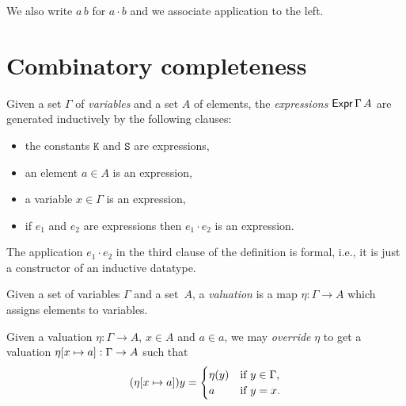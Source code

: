 We also write $a \, b$ for $a \cdot b$ and we associate application to the left.

\section{Combinatory completeness}


\begin{definition}
  \label{def:expression}
  \leanok
  Given a set $\Gamma$ of \emph{variables} and a set $A$ of elements, the
  \emph{expressions} $\mathsf{Expr}\,\Gamma\,A$ are generated inductively by the following clauses:
  \begin{itemize}
    \item the constants $\mathtt{K}$ and $\mathtt{S}$ are expressions,
    \item an element $a \in A$ is an expression,
    \item a variable $x \in \Gamma$ is an expression,
    \item if $e_1$ and $e_2$ are expressions then $e_1 \cdot e_2$ is an expression.
  \end{itemize}
\end{definition}

\noindent
The application $e_1 \cdot e_2$ in the third clause of the definition is formal, i.e., it is just a constructor of an inductive datatype.

Given a set of variables $\Gamma$ and a set~$A$, a \emph{valuation} is a map $\eta : \Gamma \to A$ which assigns elements to variables.

\begin{definition}
  \label{def:override}%
  \leanok
  Given a valuation $\eta : \Gamma \to A$, $x \in A$ and $a \in a$, we may \emph{override} $\eta$
  to get a valuation $\eta[x \mapsto a] : \Gamma \to A$ such that
  \begin{equation*}
    (\eta[x \mapsto a]) y =
    \begin{cases}
      \eta(y) &\text{if $y \in \Gamma$,}\\
      a       &\text{if $y = x$.}
    \end{cases}
  \end{equation*}
\end{definition}

